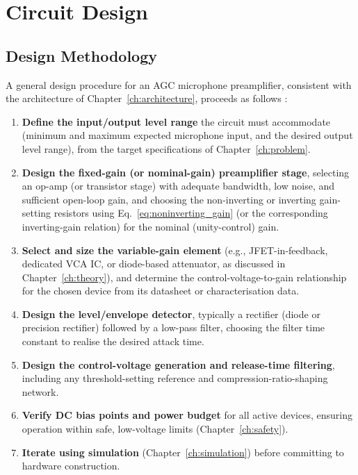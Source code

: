 \chapter{Circuit Design}
\label{ch:circuitdesign}

\section{Design Methodology}

A general design procedure for an AGC microphone preamplifier, consistent with the architecture of Chapter~\ref{ch:architecture}, proceeds as follows \cite{ref1,ref2,ref4,ref5,ref6}:

\begin{enumerate}
    \item \textbf{Define the input/output level range} the circuit must accommodate (minimum and maximum expected microphone input, and the desired output level range), from the target specifications of Chapter~\ref{ch:problem}.
    \item \textbf{Design the fixed-gain (or nominal-gain) preamplifier stage}, selecting an op-amp (or transistor stage) with adequate bandwidth, low noise, and sufficient open-loop gain, and choosing the non-inverting or inverting gain-setting resistors using Eq.~\ref{eq:noninverting_gain} (or the corresponding inverting-gain relation) for the nominal (unity-control) gain.
    \item \textbf{Select and size the variable-gain element} (e.g., JFET-in-feedback, dedicated VCA IC, or diode-based attenuator, as discussed in Chapter~\ref{ch:theory}), and determine the control-voltage-to-gain relationship for the chosen device from its datasheet or characterisation data.
    \item \textbf{Design the level/envelope detector}, typically a rectifier (diode or precision rectifier) followed by a low-pass filter, choosing the filter time constant to realise the desired attack time.
    \item \textbf{Design the control-voltage generation and release-time filtering}, including any threshold-setting reference and compression-ratio-shaping network.
    \item \textbf{Verify DC bias points and power budget} for all active devices, ensuring operation within safe, low-voltage limits (Chapter~\ref{ch:safety}).
    \item \textbf{Iterate using simulation} (Chapter~\ref{ch:simulation}) before committing to hardware construction.
\end{enumerate}


